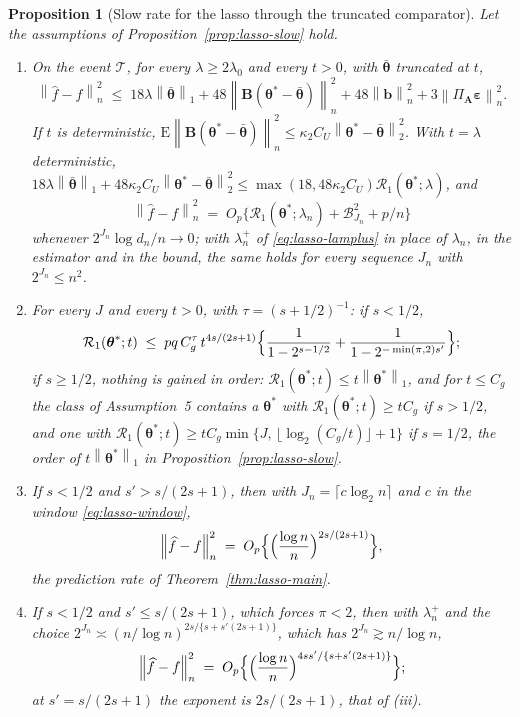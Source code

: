 \documentclass[10pt]{book}
\newtheorem{proposition}{Proposition}[section]
\theoremstyle{definition}
\newcommand{\E}{\mathrm{E}}
\newcommand{\norm}[1]{\left\lVert #1 \right\rVert}
\newcommand{\normn}[1]{\left\lVert #1 \right\rVert_{n}}
\newcommand{\btheta}{\boldsymbol{\theta}}
\newcommand{\thetastar}{\btheta^{*}}
\newcommand{\pen}{\lambda}
\newcommand{\penn}{\lambda_{n}}
\newcommand{\seff}{s'}
\newcommand{\Amat}{\mathbf{A}}
\newcommand{\Bmat}{\mathbf{B}}
\newcommand{\PA}{\Pi_{\Amat}}
\newcommand{\bveps}{\boldsymbol{\varepsilon}}
\newcommand{\bb}{\mathbf{b}}
\newcommand{\thbar}{\bar{\btheta}}
\newcommand{\Rone}{\mathcal{R}_{1}}
\begin{document}
{\begin{proposition}[Slow rate for the lasso through the truncated comparator]
\label{prop:lasso-truncated}
Let the assumptions of Proposition~\ref{prop:lasso-slow} hold.
\begin{enumerate}
\item[(i)] On the event $\mathcal{T}$, for every $\pen \ge 2\pen_0$ and
every $t > 0$, with $\thbar$ truncated at $t$,
\[
  \normn{\widehat{f}-f}^{2}
  \;\le\; 18\pen\norm{\thbar}_{1} + 48\normn{\Bmat(\thetastar-\thbar)}^{2}
  + 48\normn{\bb}^{2} + 3\normn{\PA\bveps}^{2} .
\]
If $t$ is deterministic,
$\E\normn{\Bmat(\thetastar-\thbar)}^{2} \le
\kappa_2C_U\norm{\thetastar-\thbar}_{2}^{2}$. With $t = \pen$ deterministic,
$18\pen\norm{\thbar}_{1} + 48\kappa_2C_U\norm{\thetastar-\thbar}_{2}^{2} \le
\max(18,48\kappa_2C_U)\Rone(\thetastar;\pen)$, and
\[
  \normn{\widehat{f}-f}^{2} \;=\; O_p\bigl\{\Rone(\thetastar;\penn)
  + \mathcal{B}_{J_n}^{2} + p/n\bigr\}
\]
whenever $2^{J_n}\log d_n/n \to 0$; with $\penn^{+}$ of
\eqref{eq:lasso-lamplus} in place of $\penn$, in the estimator and in the
bound, the same holds for every sequence $J_n$ with $2^{J_n} \le n^{2}$.
\item[(ii)] For every $J$ and every $t > 0$, with $\tau = (s+1/2)^{-1}$: if
$s < 1/2$,
\begin{equation}
  \label{eq:count-lasso-truncated}
  \Rone(\thetastar;t) \;\le\; pq\,C_g^{\tau}\,t^{4s/(2s+1)}
  \Bigl\{\frac{1}{1-2^{s-1/2}} + \frac{1}{1-2^{-\min(\pi,2)\seff}}\Bigr\};
\end{equation}
if $s \ge 1/2$, nothing is gained in order: $\Rone(\thetastar;t) \le
t\norm{\thetastar}_{1}$, and for $t \le C_g$ the class of Assumption~5
contains a $\thetastar$ with $\Rone(\thetastar;t) \ge tC_g$ if $s > 1/2$,
and one with $\Rone(\thetastar;t) \ge
tC_g\min\{J,\,\lfloor\log_2(C_g/t)\rfloor + 1\}$ if $s = 1/2$, the order of
$t\norm{\thetastar}_{1}$ in Proposition~\ref{prop:lasso-slow}.
\item[(iii)] If $s < 1/2$ and $\seff > s/(2s+1)$, then with
$J_n = \lceil c\log_2 n\rceil$ and $c$ in the window \eqref{eq:lasso-window},
\[
  \normn{\widehat{f}-f}^{2}
  \;=\; O_p\Bigl\{\Bigl(\frac{\log n}{n}\Bigr)^{2s/(2s+1)}\Bigr\},
\]
the prediction rate of Theorem~\ref{thm:lasso-main}.
\item[(iv)] If $s < 1/2$ and $\seff \le s/(2s+1)$, which forces $\pi < 2$,
then with $\penn^{+}$ and the choice
$2^{J_n} \asymp (n/\log n)^{2s/\{s+\seff(2s+1)\}}$, which has
$2^{J_n} \gtrsim n/\log n$,
\[
  \normn{\widehat{f}-f}^{2}
  \;=\; O_p\Bigl\{\Bigl(\frac{\log n}{n}\Bigr)^{4s\seff/\{s+\seff(2s+1)\}}\Bigr\};
\]
at $\seff = s/(2s+1)$ the exponent is $2s/(2s+1)$, that of (iii).
\end{enumerate}
\end{proposition}

}
\end{document}
